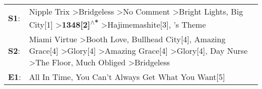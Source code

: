 \begin{supertabular}{p{0.03\textwidth}p{0.92\textwidth}}
 \textbf{S1}:  &                                                                                                                                                    Nipple Trix\textsuperscript{} \textgreater \enspace Bridgeless\textsuperscript{} \textgreater \enspace No Comment\textsuperscript{} \textgreater \enspace Bright Lights, Big City[1]\textsuperscript{} \textgreater \enspace \textbf{1348[2]\textsuperscript{$\wedge$*}} \textgreater \enspace Hajimemashite[3]\textsuperscript{}, 's Theme\textsuperscript{}  \enspace  \\
 \textbf{S2}:  &  Miami Virtue\textsuperscript{} \textgreater \enspace Booth Love\textsuperscript{}, \enspace Bullhead City[4]\textsuperscript{}, \enspace Amazing Grace[4]\textsuperscript{} \textgreater \enspace Glory[4]\textsuperscript{} \textgreater \enspace Amazing Grace[4]\textsuperscript{} \textgreater \enspace Glory[4]\textsuperscript{}, \enspace Day Nurse\textsuperscript{} \textgreater \enspace The Floor\textsuperscript{}, \enspace Much Obliged\textsuperscript{} \textgreater \enspace Bridgeless\textsuperscript{}  \enspace  \\
 \textbf{E1}:  &                                                                                                                                                                                                                                                                                                                                                                                                                             All In Time\textsuperscript{}, \enspace You Can't Always Get What You Want[5]\textsuperscript{}  \enspace  \\
\end{supertabular}
